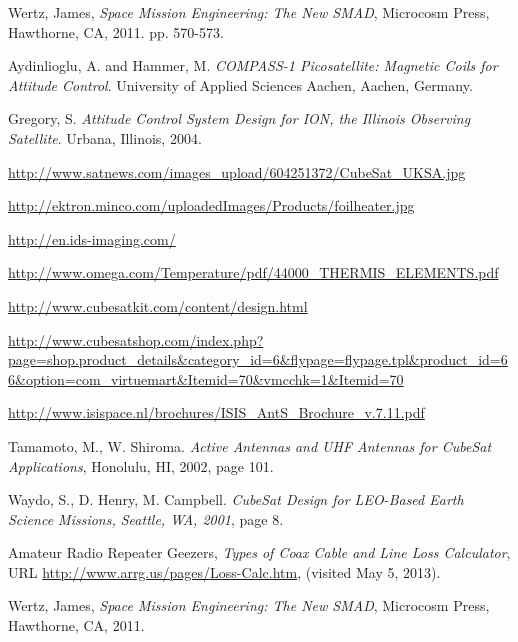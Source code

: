 \documentclass[12pt]{article}
\begin{document}
\begin{thebibliography}{9}
Wertz, James, \emph{Space Mission Engineering: The New SMAD}, Microcosm Press, Hawthorne, CA, 2011. pp. 570-573. 

Aydinlioglu, A. and Hammer, M. \emph{COMPASS-1 Picosatellite: Magnetic Coils for Attitude Control}. University of Applied Sciences Aachen, Aachen, Germany. 

Gregory, S. \emph{Attitude Control System Design for ION, the Illinois Observing Satellite}. Urbana, Illinois, 2004.

\url{http://www.satnews.com/images_upload/604251372/CubeSat_UKSA.jpg}

\url{http://ektron.minco.com/uploadedImages/Products/foilheater.jpg}

\url{http://en.ids-imaging.com/}

\url{http://www.omega.com/Temperature/pdf/44000_THERMIS_ELEMENTS.pdf}


\url{http://www.cubesatkit.com/content/design.html}

\url{http://www.cubesatshop.com/index.php?page=shop.product_details&category_id=6&flypage=flypage.tpl&product_id=66&option=com_virtuemart&Itemid=70&vmcchk=1&Itemid=70}

\url{http://www.isispace.nl/brochures/ISIS_AntS_Brochure_v.7.11.pdf}

Tamamoto, M., W. Shiroma. \emph{Active Antennas and UHF Antennas for CubeSat Applications}, Honolulu, HI, 2002, page 101.

Waydo, S., D. Henry, M. Campbell. \emph{CubeSat Design for LEO-Based Earth Science Missions, Seattle, WA, 2001}, page 8.

Amateur Radio Repeater Geezers, \emph{Types of Coax Cable and Line Loss Calculator}, URL \url{http://www.arrg.us/pages/Loss-Calc.htm}, (visited May 5, 2013).






Wertz, James, \emph{Space Mission Engineering: The New SMAD}, Microcosm Press, Hawthorne, CA, 2011.


\end{thebibliography}
\end{document}
